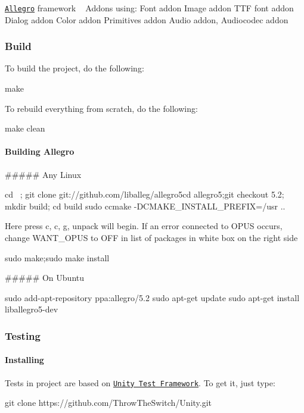 \href{http://liballeg.org/}{\tt Allegro} framework ~\newline
 Addons using\+: Font addon Image addon T\+TF font addon Dialog addon Color addon Primitives addon Audio addon, Audiocodec addon

\subsubsection*{Build}

To build the project, do the following\+: 
\begin{DoxyCode}
make
\end{DoxyCode}
 To rebuild everything from scratch, do the following\+: 
\begin{DoxyCode}
make clean
\end{DoxyCode}
 \paragraph*{Building Allegro}

\#\#\#\#\# Any Linux 
\begin{DoxyCode}
cd ~; git clone git:\textcolor{comment}{//github.com/liballeg/allegro5cd allegro5;git checkout 5.2; mkdir build; cd build}
sudo ccmake -DCMAKE\_INSTALL\_PREFIX=/usr ..
\end{DoxyCode}
 Here press \textquotesingle{}c\textquotesingle{}, \textquotesingle{}c\textquotesingle{}, \textquotesingle{}g\textquotesingle{}, unpack will begin. If an error connected to O\+P\+US occurs, change W\+A\+N\+T\+\_\+\+O\+P\+US to \textquotesingle{}O\+FF\textquotesingle{} in list of packages in white box on the right side 
\begin{DoxyCode}
sudo make;sudo make install
\end{DoxyCode}
 \#\#\#\#\# On Ubuntu 
\begin{DoxyCode}
sudo add-apt-repository ppa:allegro/5.2
sudo apt-\textcolor{keyword}{get} update
sudo apt-\textcolor{keyword}{get} install liballegro5-dev
\end{DoxyCode}
 \subsubsection*{Testing}

\paragraph*{Installing}

Tests in project are based on \href{http://www.throwtheswitch.org/unity}{\tt Unity Test Framework}. To get it, just type\+: 
\begin{DoxyCode}
git clone https:\textcolor{comment}{//github.com/ThrowTheSwitch/Unity.git}
\end{DoxyCode}

